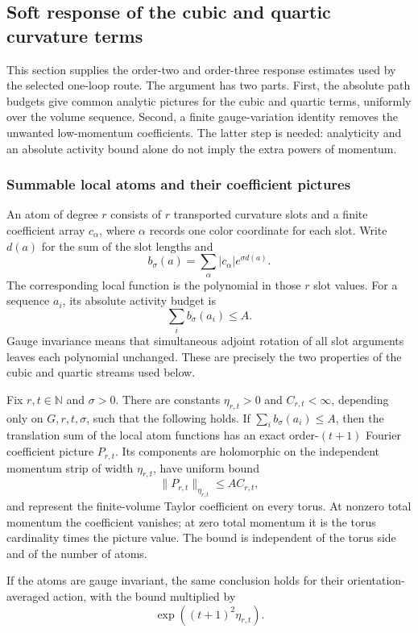 \subsection{Soft response of the cubic and quartic curvature terms}
\label{sec:ex-soft-curvature-receipts}

This section supplies the order-two and order-three response estimates used
by the selected one-loop route. The argument has two parts. First, the
absolute path budgets give common analytic pictures for the cubic and
quartic terms, uniformly over the volume sequence. Second, a finite
gauge-variation identity removes the unwanted low-momentum coefficients.
The latter step is needed: analyticity and an absolute activity bound alone
do not imply the extra powers of momentum.

\subsubsection{Summable local atoms and their coefficient pictures}

An atom of degree $r$ consists of $r$ transported curvature slots and a
finite coefficient array $c_\alpha$, where $\alpha$ records one color
coordinate for each slot. Write $d(a)$ for the sum of the slot lengths and
\[
   b_\sigma(a)=\sum_\alpha |c_\alpha|e^{\sigma d(a)}.
\]
The corresponding local function is the polynomial in those $r$ slot
values. For a sequence $a_i$, its absolute activity budget is
\[
   \sum_i b_\sigma(a_i)\leq A.
\]
Gauge invariance means that simultaneous adjoint rotation of all slot
arguments leaves each polynomial unchanged. These are precisely the two
properties of the cubic and quartic streams used below.

\begin{proposition}
\label{prop:ex-atom-stream-picture}
Fix $r,t\in\mathbb N$ and $\sigma>0$. There are constants
$\eta_{r,t}>0$ and $C_{r,t}<\infty$, depending only on $G,r,t,\sigma$,
such that the following holds. If $\sum_i b_\sigma(a_i)\leq A$, then the
translation sum of the local atom functions has an exact order-$(t+1)$
Fourier coefficient picture $P_{r,t}$. Its components are holomorphic on
the independent momentum strip of width $\eta_{r,t}$, have uniform bound
\[
       \|P_{r,t}\|_{\eta_{r,t}}\leq A C_{r,t},
\]
and represent the finite-volume Taylor coefficient on every torus. At
nonzero total momentum the coefficient vanishes; at zero total momentum it
is the torus cardinality times the picture value. The bound is independent
of the torus side and of the number of atoms.

If the atoms are gauge invariant, the same conclusion holds for their
orientation-averaged action, with the bound multiplied by
\[
       \exp((t+1)^2\eta_{r,t}).
\]
\end{proposition}

